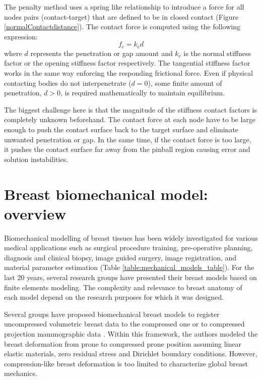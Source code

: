 The penalty method uses a spring like relationship to introduce a force for all nodes pairs (contact-target) that are defined to be in closed contact (Figure \ref{normalContactdistance}). The contact force is computed using the following expression:
\begin{equation}
f_c = k_c d
\end{equation}
where $d$ represents the penetration or gap amount and $k_c$ is the normal stiffness factor or the opening stiffness factor respectively. The tangential stiffness factor works in the same way enforcing the responding frictional force. Even if physical contacting bodies do not interpenetrate ($d = 0$), some finite amount of penetration, $d > 0$, is required mathematically to maintain equilibrium. 
 
 The biggest challenge here is that the magnitude of the stiffness contact factors is completely unknown beforehand. The contact force at each node have to be large enough to push the contact surface back to the target surface and eliminate unwanted penetration or gap. In the same time, if the contact force is too large, it pushes the contact surface far away from the pinball region causing error and solution instabilities.

\section{Breast biomechanical model: overview}

Biomechanical modelling of breast tissues has been widely investigated for various medical applications such as surgical procedure training, pre-operative planning, diagnosis and clinical biopsy, image guided surgery, image registration, and material parameter estimation (Table \ref{table:mechanical_models_table}). For the last 20 years, several research groups have presented their breast models based on finite elements modeling.  The complexity and relevance to breast anatomy of each model depend on the research purposes for which it was designed. 

Several groups have proposed biomechanical breast models to register uncompressed volumetric breast data to the compressed one \citep{han_development_2012,ruiter_model_based_2006,sturgeon_finite_element_2016} or to compressed projection mammographic data \citep{kellner_simulation_2007}. Within this framework, the authors modeled the breast deformation from prone to compressed prone position assuming linear elastic materials, zero residual stress and Dirichlet boundary conditions.
However, compression-like breast deformation is too limited to characterize global breast mechanics.

